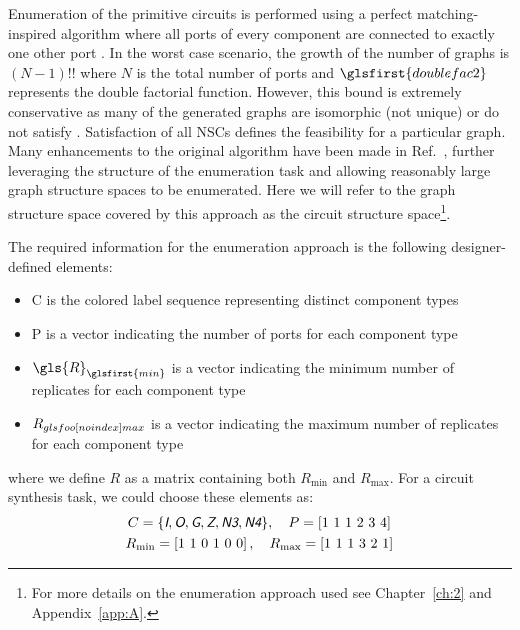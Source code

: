 Enumeration of the primitive circuits is performed using a perfect matching-inspired algorithm where all ports of every component are connected to exactly one other port \cite{Herber2017a}.
In the worst case scenario, the growth of the number of graphs is $(N-1)!!$ where $N$ is the total number of ports and $\glsfirst{doublefac2}$ represents the double factorial function.
However, this bound is extremely conservative as many of the generated graphs are isomorphic (not unique) or do not satisfy .
Satisfaction of all NSCs defines the feasibility for a particular graph. 
Many enhancements to the original algorithm have been made in Ref.~\cite{Herber2017d}, further leveraging the structure of the enumeration task and allowing reasonably large graph structure spaces to be enumerated.
Here we will refer to the graph structure space covered by this approach as the circuit structure space\footnote{For more details on the enumeration approach used see Chapter~\ref{ch:2} and Appendix~\ref{app:A}.}.

The required information for the enumeration approach is the following designer-defined elements:
\begin{itemize}
\item \gls{C} is the colored label sequence representing distinct component types
\item \gls{P} is a vector indicating the number of ports for each component type
\item $\gls{R}_{\glsfirst{min}}$ is a vector indicating the minimum number of replicates for each component type
\item $R_{\\glsfoo[noindex]{max}}$ is a vector indicating the maximum number of replicates for each component type
\end{itemize}

\noindent where we define $R$ as a matrix containing both $R_{\min}$ and $R_{\max}$.
For a circuit synthesis task, we could choose these elements as:
% 
\begin{subequations}
\label{eq:ch6:lib1}
\begin{gather}
C = \{ \xcolor{I}, \xcolor{O}, \xcolor{G}, \xcolor{Z}, \xcolor{N3}, \xcolor{N4}  \}, \quad P = \left[ 1\ 1\ 1\ 2\ 3\ 4 \right] \\
R_{\min} = \left[ 1\ 1\ 0\ 1\ 0\ 0 \right], \quad R_{\max} = \left[ 1\ 1\ 1\ 3\ 2\ 1 \right]
\end{gather}
\end{subequations}


